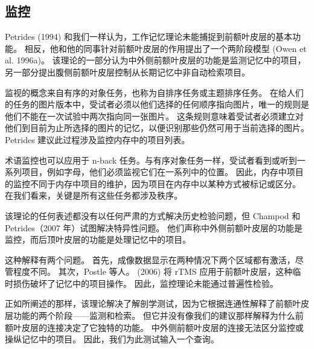 \subsection{监控}
Petrides (1994) 和我们一样认为，工作记忆理论未能捕捉到前额叶皮层的基本功能。 相反，他和他的同事针对前额叶皮层的作用提出了一个两阶段模型 (Owen et al. 1996a)。 该理论的一部分认为中外侧前额叶皮层的功能是监测记忆中的项目，另一部分提出腹侧前额叶皮层控制从长期记忆中非自动检索项目。
\par 
监视的概念来自有序的对象任务，也称为自排序任务或主题排序任务。 在给人们的任务的图片版本中，受试者必须以他们选择的任何顺序指向图片，唯一的规则是他们不能在一次试验中两次指向同一张图片。 这条规则意味着受试者必须建立对他们到目前为止所选择的图片的记忆，以便识别那些仍然可用于当前选择的图片。 Petrides 建议此过程涉及监控内存中的项目列表。
\par 
术语监控也可以应用于 n-back 任务。与有序对象任务一样，受试者看到或听到一系列项目，例如字母，他们必须监视它们在一系列中的位置。 因此，内存中项目的监控不同于内存中项目的维护，因为项目在内存中以某种方式被标记或区分。 在我们看来，关键是所有这些任务都涉及秩序。
\par 
该理论的任何表述都没有以任何严肃的方式解决历史检验问题，但 Champod 和 Petrides（2007 年）试图解决特异性问题。 他们声称中外侧前额叶皮层的功能是监控，而后顶叶皮层的功能是处理记忆中的项目。
\par 
这种解释有两个问题。 首先，成像数据显示在两种情况下两个区域都有激活，尽管程度不同。 其次，Postle 等人。 (2006) 将 rTMS 应用于前额叶皮层，这种临时损伤破坏了记忆中的项目操作。 因此，监控理论未能通过普遍性检验。
\par 
正如所阐述的那样，该理论解决了解剖学测试，因为它根据连通性解释了前额叶皮层功能的两个阶段——监测和检索。 但它并没有像我们的建议那样解释为什么前额叶皮层的连接决定了它独特的功能。 中外侧前额叶皮层的连接无法区分监控或操纵记忆中的项目。 因此，我们为此测试输入一个查询。
